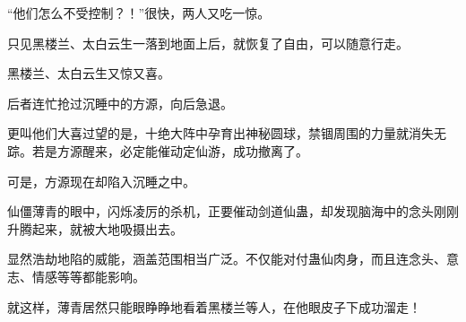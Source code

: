 \begin{this_body}
“他们怎么不受控制？！”很快，两人又吃一惊。

只见黑楼兰、太白云生一落到地面上后，就恢复了自由，可以随意行走。

黑楼兰、太白云生又惊又喜。

后者连忙抢过沉睡中的方源，向后急退。

更叫他们大喜过望的是，十绝大阵中孕育出神秘圆球，禁锢周围的力量就消失无踪。若是方源醒来，必定能催动定仙游，成功撤离了。

可是，方源现在却陷入沉睡之中。

仙僵薄青的眼中，闪烁凌厉的杀机，正要催动剑道仙蛊，却发现脑海中的念头刚刚升腾起来，就被大地吸摄出去。

显然浩劫地陷的威能，涵盖范围相当广泛。不仅能对付蛊仙肉身，而且连念头、意志、情感等等都能影响。

就这样，薄青居然只能眼睁睁地看着黑楼兰等人，在他眼皮子下成功溜走！

\end{this_body}

